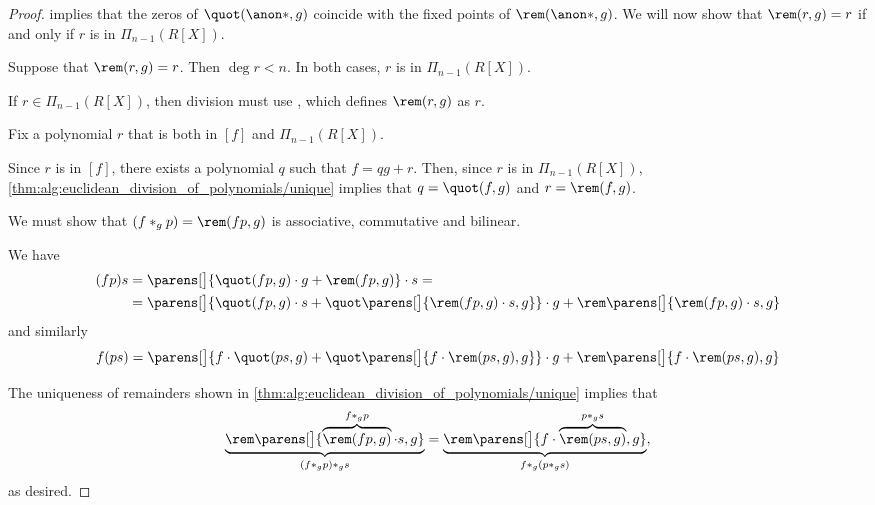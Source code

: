 \begin{proof}
    implies that the zeros of \( \quot(\anon*, g) \) coincide with the fixed points of \( \rem(\anon*, g) \). We will now show that \( \rem(r, g) = r \) if and only if \( r \) is in \( \Pi_{n-1}(R[X]) \).

  \SufficiencySubProof* Suppose that \( \rem(r, g) = r \). Then \( \deg r < n \). In both cases, \( r \) is in \( \Pi_{n-1}(R[X]) \).

  \NecessitySubProof* If \( r \in \Pi_{n-1}(R[X]) \), then division must use , which defines \( \rem(r, g) \) as \( r \).

   Fix a polynomial \( r \) that is both in \( [f] \) and \( \Pi_{n-1}(R[X]) \).

  Since \( r \) is in \( [f] \), there exists a polynomial \( q \) such that \( f = qg + r \). Then, since \( r \) is in \( \Pi_{n-1}(R[X]) \), \cref{thm:alg:euclidean_division_of_polynomials/unique} implies that \( q = \quot(f, g) \) and \( r = \rem(f, g) \).

   We must show that \( (f \ast_g p) = \rem(fp, g) \) is associative, commutative and bilinear.

   We have
  \begin{align*}
    (fp)s
    &=
    \parens[\big]{ \quot(fp, g) \cdot g + \rem(fp, g) } \cdot s
    = \\ &=
    \parens[\big]{ \quot(fp, g) \cdot s + \quot\parens[\big]{ \rem(fp, g) \cdot s, g } } \cdot g + \rem\parens[\big]{ \rem(fp, g) \cdot s, g }
  \end{align*}
  and similarly
  \begin{equation*}
    f(ps)
    =
    \parens[\big]{ f \cdot \quot(ps, g) + \quot\parens[\big]{ f \cdot \rem(ps, g), g } } \cdot g + \rem\parens[\big]{ f \cdot \rem(ps, g), g }
  \end{equation*}

  The uniqueness of remainders shown in \cref{thm:alg:euclidean_division_of_polynomials/unique} implies that
  \begin{equation*}
    \underbrace{\rem\parens[\big]{ \overbrace{\rem(fp, g)}^{f \ast_g p} \cdot s, g }}_{(f \ast_g p) \ast_g s} = \underbrace{\rem\parens[\big]{ f \cdot \overbrace{\rem(ps, g)}^{p \ast_g s}, g }}_{f \ast_g (p \ast_g s)},
  \end{equation*}
  as desired.


\end{proof}
